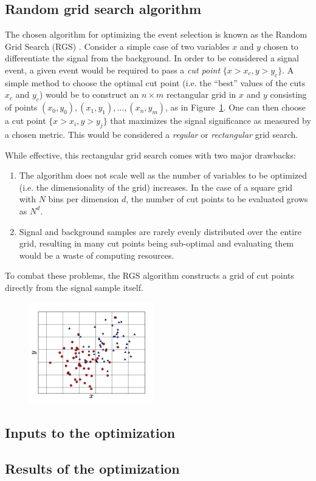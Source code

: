 
\subsection{Random grid search algorithm}\label{sswwupgrade:opt_rgs}
The chosen algorithm for optimizing the event selection is known as the Random Grid Search (RGS) \cite{2018.rgs-paper}.
Consider a simple case of two variables $x$ and $y$ chosen to differentiate the signal from the background.
In order to be considered a signal event, a given event would be required to pass a \emph{cut point} $\{x > x_c, y > y_c\}$.
A simple method to choose the optimal cut point (i.e. the ``best'' values of the cuts $x_c$ and $y_c$) would be to construct an $n\times m$ rectangular grid in $x$ and $y$ consisting of points $(x_0,y_0), (x_1,y_1), ..., (x_n,y_m)$, as in Figure~\ref{fig:rgs_square_grid}.
One can then choose a cut point $\{x > x_i, y > y_j\}$ that maximizes the signal significance as measured by a chosen metric.
This would be considered a \emph{regular} or \emph{rectangular} grid search.

While effective, this rectangular grid search comes with two major drawbacks:
\begin{enumerate}
\item The algorithm does not scale well as the number of variables to be optimized (i.e. the dimensionality of the grid) increases.  In the case of a square grid with $N$ bins per dimension $d$, the number of cut points to be evaluated grows as $N^d$.
\item Signal and background samples are rarely evenly distributed over the entire grid, resulting in many cut points being sub-optimal and evaluating them would be a waste of computing resources.
\end{enumerate}

To combat these problems, the RGS algorithm constructs a grid of cut points directly from the signal sample itself.

\begin{figure}[htp]
  \centering
  \includegraphics[width=0.48\textwidth]{figs/ssww_upgrade/rgs/figures_cuts_regulargrid}
  \caption{}   
  \label{fig:rgs_square_grid}
\end{figure}

\subsection{Inputs to the optimization}\label{sswwupgrade:opt_inputs}

\subsection{Results of the optimization}\label{sswwupgrade:opt_results}
